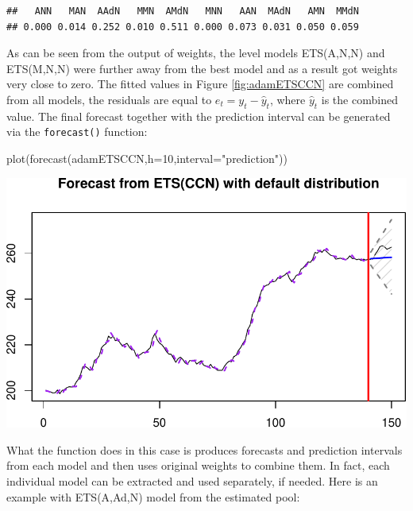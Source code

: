 \documentclass[
]{book}
\newenvironment{Shaded}{\begin{snugshade}}{\end{snugshade}}
\newcommand{\AttributeTok}[1]{\textcolor[rgb]{0.77,0.63,0.00}{#1}}
\newcommand{\DecValTok}[1]{\textcolor[rgb]{0.00,0.00,0.81}{#1}}
\newcommand{\FunctionTok}[1]{\textcolor[rgb]{0.00,0.00,0.00}{#1}}
\newcommand{\NormalTok}[1]{#1}
\newcommand{\SpecialCharTok}[1]{\textcolor[rgb]{0.00,0.00,0.00}{#1}}
\newcommand{\StringTok}[1]{\textcolor[rgb]{0.31,0.60,0.02}{#1}}
\theoremstyle{definition}
\theoremstyle{definition}
\theoremstyle{definition}
\theoremstyle{definition}
\theoremstyle{remark}
\begin{document}
\begin{Shaded}
\end{Shaded}

\begin{verbatim}
##   ANN   MAN  AAdN   MMN  AMdN   MNN   AAN  MAdN   AMN  MMdN 
## 0.000 0.014 0.252 0.010 0.511 0.000 0.073 0.031 0.050 0.059
\end{verbatim}

As can be seen from the output of weights, the level models ETS(A,N,N) and ETS(M,N,N) were further away from the best model and as a result got weights very close to zero. The fitted values in Figure \ref{fig:adamETSCCN} are combined from all models, the residuals are equal to \(e_t = y_t - \hat{y}_t\), where \(\hat{y}_t\) is the combined value. The final forecast together with the prediction interval can be generated via the \texttt{forecast()} function:

\begin{Shaded}
\begin{Highlighting}[]
\FunctionTok{plot}\NormalTok{(}\FunctionTok{forecast}\NormalTok{(adamETSCCN,}\AttributeTok{h=}\DecValTok{10}\NormalTok{,}\AttributeTok{interval=}\StringTok{"prediction"}\NormalTok{))}
\end{Highlighting}
\end{Shaded}

\includegraphics{adam_files/figure-latex/unnamed-chunk-176-1.pdf}

What the function does in this case is produces forecasts and prediction intervals from each model and then uses original weights to combine them. In fact, each individual model can be extracted and used separately, if needed. Here is an example with ETS(A,Ad,N) model from the estimated pool:
\end{document}
